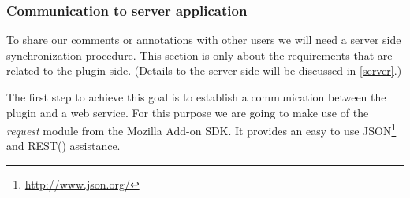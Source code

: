 \subsubsection{Communication to server application}
To share our comments or annotations with other users we will need a server side synchronization procedure. This section is only about the requirements that are related to the plugin side. (Details to the server side will be discussed in  \ref{server}.)

The first step to achieve this goal is to establish a communication between the plugin and a web service. For this purpose we are going to make use of the \emph{request} module from the Mozilla Add-on SDK. It provides an easy to use JSON\footnote{\url{http://www.json.org/}} and REST(\cite{fielding2000principled}) assistance. 

